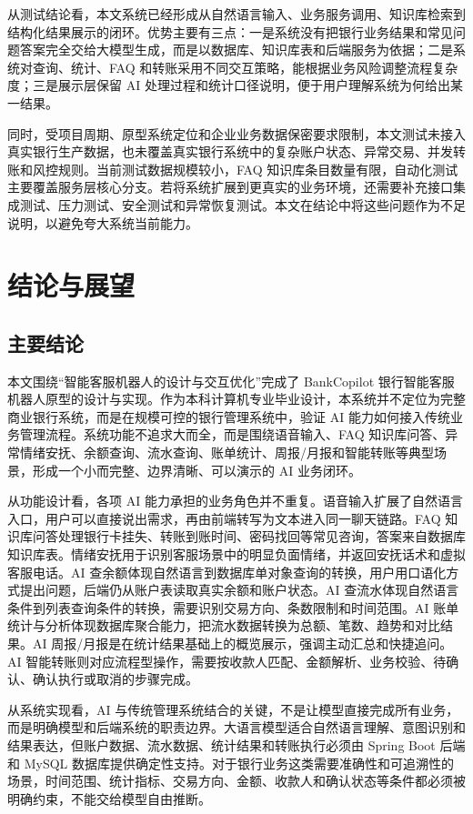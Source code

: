 \documentclass[bachelor, print]{xduthesis}
\begin{document}
从测试结论看，本文系统已经形成从自然语言输入、业务服务调用、知识库检索到结构化结果展示的闭环。优势主要有三点：一是系统没有把银行业务结果和常见问题答案完全交给大模型生成，而是以数据库、知识库表和后端服务为依据；二是系统对查询、统计、FAQ 和转账采用不同交互策略，能根据业务风险调整流程复杂度；三是展示层保留 AI 处理过程和统计口径说明，便于用户理解系统为何给出某一结果。

同时，受项目周期、原型系统定位和企业业务数据保密要求限制，本文测试未接入真实银行生产数据，也未覆盖真实银行系统中的复杂账户状态、异常交易、并发转账和风控规则。当前测试数据规模较小，FAQ 知识库条目数量有限，自动化测试主要覆盖服务层核心分支。若将系统扩展到更真实的业务环境，还需要补充接口集成测试、压力测试、安全测试和异常恢复测试。本文在结论中将这些问题作为不足说明，以避免夸大系统当前能力。

\chapter{结论与展望}

\section{主要结论}

本文围绕“智能客服机器人的设计与交互优化”完成了 BankCopilot 银行智能客服机器人原型的设计与实现。作为本科计算机专业毕业设计，本系统并不定位为完整商业银行系统，而是在规模可控的银行管理系统中，验证 AI 能力如何接入传统业务管理流程。系统功能不追求大而全，而是围绕语音输入、FAQ 知识库问答、异常情绪安抚、余额查询、流水查询、账单统计、周报/月报和智能转账等典型场景，形成一个小而完整、边界清晰、可以演示的 AI 业务闭环。

从功能设计看，各项 AI 能力承担的业务角色并不重复。语音输入扩展了自然语言入口，用户可以直接说出需求，再由前端转写为文本进入同一聊天链路。FAQ 知识库问答处理银行卡挂失、转账到账时间、密码找回等常见咨询，答案来自数据库知识库表。情绪安抚用于识别客服场景中的明显负面情绪，并返回安抚话术和虚拟客服电话。AI 查余额体现自然语言到数据库单对象查询的转换，用户用口语化方式提出问题，后端仍从账户表读取真实余额和账户状态。AI 查流水体现自然语言条件到列表查询条件的转换，需要识别交易方向、条数限制和时间范围。AI 账单统计与分析体现数据库聚合能力，把流水数据转换为总额、笔数、趋势和对比结果。AI 周报/月报是在统计结果基础上的概览展示，强调主动汇总和快捷追问。AI 智能转账则对应流程型操作，需要按收款人匹配、金额解析、业务校验、待确认、确认执行或取消的步骤完成。

从系统实现看，AI 与传统管理系统结合的关键，不是让模型直接完成所有业务，而是明确模型和后端系统的职责边界。大语言模型适合自然语言理解、意图识别和结果表达，但账户数据、流水数据、统计结果和转账执行必须由 Spring Boot 后端和 MySQL 数据库提供确定性支持。对于银行业务这类需要准确性和可追溯性的场景，时间范围、统计指标、交易方向、金额、收款人和确认状态等条件都必须被明确约束，不能交给模型自由推断。
\end{document}
